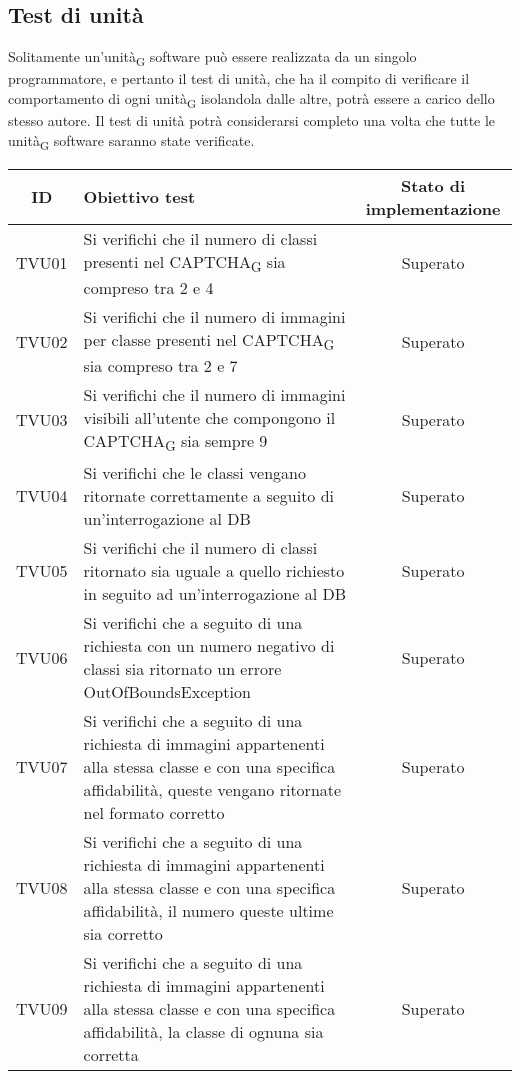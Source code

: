 \subsection{Test di unità}
Solitamente un'unità\textsubscript{G} software può essere realizzata da un singolo programmatore, e pertanto il test di unità, che ha il compito di verificare il comportamento di ogni unità\textsubscript{G} isolandola dalle altre, potrà essere a carico dello stesso autore. Il test di unità potrà considerarsi completo una volta che tutte le unità\textsubscript{G} software saranno state verificate.
\begin{center}
	\setlength\extrarowheight{5pt}
	\begin{xltabular}{\textwidth}{|c|X|c|}
		\hline
		\textbf{ID} & \textbf{Obiettivo test} & \textbf{Stato di implementazione} \\
		\hline
		TVU01 & Si verifichi che il numero di classi presenti nel CAPTCHA\textsubscript{G} sia compreso tra 2 e 4 & Superato\\
		\hline
		TVU02 & Si verifichi che il numero di immagini per classe presenti nel CAPTCHA\textsubscript{G} sia compreso tra 2 e 7 & Superato\\
		\hline
		TVU03 & Si verifichi che il numero di immagini visibili all'utente che compongono il CAPTCHA\textsubscript{G} sia sempre 9 & Superato\\
		\hline
		TVU04 & Si verifichi che le classi vengano ritornate correttamente a seguito di un'interrogazione al DB & Superato\\
		\hline
		TVU05 & Si verifichi che il numero di classi ritornato sia uguale a quello richiesto in seguito ad un'interrogazione al DB & Superato\\
		\hline
		TVU06 & Si verifichi che a seguito di una richiesta con un numero negativo di classi sia ritornato un errore OutOfBoundsException & Superato\\
		\hline
		TVU07 & Si verifichi che a seguito di una richiesta di immagini appartenenti alla stessa classe e con una specifica affidabilità, queste vengano ritornate nel formato corretto & Superato\\
		\hline
		TVU08 &  Si verifichi che a seguito di una richiesta di immagini appartenenti alla stessa classe e con una specifica affidabilità, il numero queste ultime sia corretto & Superato\\
		\hline
		TVU09 &  Si verifichi che a seguito di una richiesta di immagini appartenenti alla stessa classe e con una specifica affidabilità, la classe di ognuna sia corretta & Superato\\

\end{xltabular}
\end{center}

